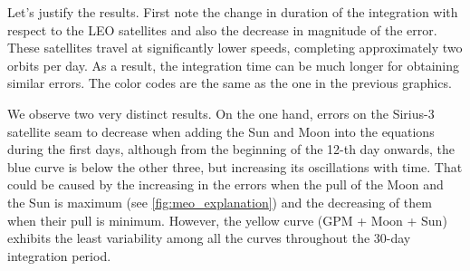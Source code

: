 \documentclass[../main.tex]{subfiles}
\begin{document}
Let's justify the results. First note the change in duration of the integration with respect to the LEO satellites and also the decrease in magnitude of the error. These satellites travel at significantly lower speeds, completing approximately two orbits per day. As a result, the integration time can be much longer for obtaining similar errors. The color codes are the same as the one in the previous graphics.

We observe two very distinct results. On the one hand, errors on the Sirius-3 satellite seam to decrease when adding the Sun and Moon into the equations during the first days, although from the beginning of the 12-th day onwards, the blue curve is below the other three, but increasing its oscillations with time. That could be caused by the increasing in the errors when the pull of the Moon and the Sun is maximum (see \cref{fig:meo_explanation}) and the decreasing of them when their pull is minimum. However, the yellow curve (GPM + Moon + Sun) exhibits the least variability among all the curves throughout the 30-day integration period.
\end{document}
